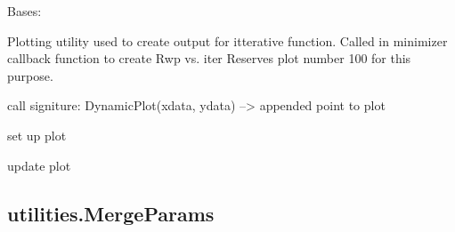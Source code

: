 \documentclass[letterpaper,10pt,english]{sphinxmanual}
\begin{document}
\begin{fulllineitems}
Bases: 

Plotting utility used to create output for itterative function.
Called in minimizer callback function to create Rwp  vs.  iter
Reserves plot number 100 for this purpose.

call signiture: DynamicPlot(xdata, ydata) --\textgreater{} appended point to plot

\begin{fulllineitems}
\end{fulllineitems}


\begin{fulllineitems}
set up plot

\end{fulllineitems}


\begin{fulllineitems}
update plot

\end{fulllineitems}


\end{fulllineitems}



\subsection{utilities.MergeParams}
\label{\detokenize{rst/utilities:utilities-mergeparams}}
\end{document}
